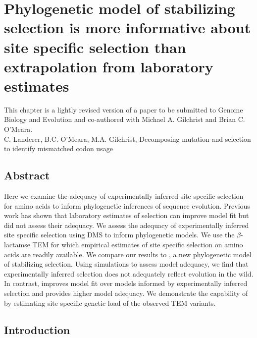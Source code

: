 \chapter{Phylogenetic model of stabilizing selection is more informative about site specific selection than extrapolation from laboratory estimates} 
\label{ch:phylogeny}

\clearpage
\pagebreak

This chapter is a lightly revised version of a paper to be submitted to Genome Biology and Evolution and co-authored with Michael A. Gilchrist and Brian C. O'Meara.\\
\newline
\newline
C. Landerer, B.C. O'Meara, M.A. Gilchrist, Decomposing mutation and selection to identify mismatched codon usage

\section{Abstract}
Here we examine the adequacy of experimentally inferred site specific selection for amino acids to inform phylogenetic inferences of sequence evolution.
Previous work has shown that laboratory estimates of selection can improve model fit but did not assess their adequacy.
We assess the adequacy of experimentally inferred site specific selection using DMS to inform phylogenetic models.
We use the $\beta$-lactamse TEM for which empirical estimates of site specific selection on amino acids are readily available.
We compare our results to \selac, a new phylogenetic model of stabilizing selection.
Using simulations to assess model adequacy, we find that experimentally inferred selection does not adequately reflect evolution in the wild.
In contrast, \selac improves model fit over models informed by experimentally inferred selection and provides higher model adequacy.
We demonstrate the capability of \selac by estimating site specific genetic load of the observed TEM variants.

\newpage

\section{Introduction}

